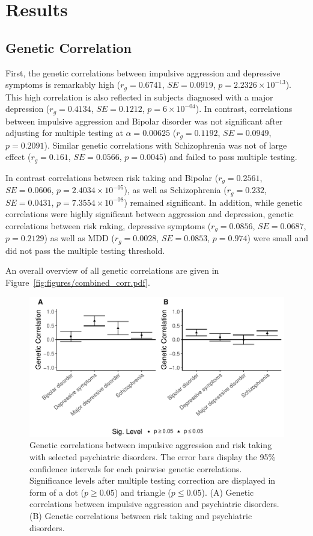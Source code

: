 \section{Results}
\label{sec:results}

\subsection{Genetic Correlation}
\label{sub:psych_genetic_correlation}

First, the genetic correlations between impulsive aggression and depressive symptoms is remarkably high ($r_g=0.6741$, $SE=0.0919$, $p=2.2326\times 10^{-13}$).
This high correlation is also reflected in subjects diagnosed with a major depression ($r_g=0.4134$, $SE=0.1212$, $p=6\times 10^{-04}$).
In contrast, correlations between impulsive aggression and Bipolar disorder was not significant after adjusting for multiple testing at $\alpha=0.00625$ ($r_g=0.1192$, $SE=0.0949$, $p=0.2091$).
Similar genetic correlations with Schizophrenia was not of large effect ($r_g=0.161$, $SE=0.0566$, $p=0.0045$) and failed to pass multiple testing.

In contrast correlations between risk taking and Bipolar ($r_g=0.2561$, $SE=0.0606$, $p=2.4034\times 10^{-05}$), as well as Schizophrenia ($r_g=0.232$, $SE=0.0431$, $p=7.3554\times 10^{-08}$) remained significant.
In addition, while genetic correlations were highly significant between aggression and depression, genetic correlations between risk raking, depressive symptoms ($r_g=0.0856$, $SE=0.0687$, $p=0.2129$) as well as MDD ($r_g=0.0028$, $SE=0.0853$, $p=0.974$) were small and did not pass the multiple testing threshold.

An overall overview of all genetic correlations are given in Figure~\ref{fig:figures/combined_corr.pdf}.

\begin{figure}[htpb]
  \centering
  \includegraphics[width=0.8\linewidth]{figures/combined_corr.pdf}
  \caption{Genetic correlations between impulsive aggression and risk taking with selected psychiatric disorders.
    The error bars display the 95\% confidence intervals for each pairwise genetic correlations.
    Significance levels after multiple testing correction are displayed in form of a dot ($p\ge 0.05$) and triangle ($p\leq0.05$).
    (A) Genetic correlations between impulsive aggression and psychiatric disorders. 
    (B) Genetic correlations between risk taking and psychiatric disorders.
  }\label{fig:figures/combined_corr}
\end{figure}


